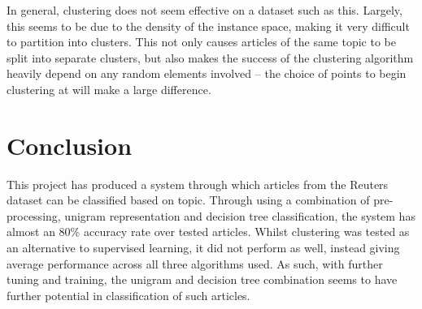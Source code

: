 \documentclass[11pt]{article}
\begin{document}
In general, clustering does not seem effective on a dataset such as this. Largely, this seems to be due to the density of the instance space, making it very difficult to partition into clusters. This not only causes articles of the same topic to be split into separate clusters, but also makes the success of the clustering algorithm heavily depend on any random elements involved – the choice of points to begin clustering at will make a large difference.  


\section{Conclusion}
This project has produced a system through which articles from the Reuters dataset can be classified based on topic. Through using a combination of pre-processing, unigram representation and decision tree classification, the system has almost an 80\% accuracy rate over tested articles. Whilst clustering was tested as an alternative to supervised learning, it did not perform as well, instead giving average performance across all three algorithms used. As such, with further tuning and training, the unigram and decision tree combination seems to have further potential in classification of such articles.



\end{document}

